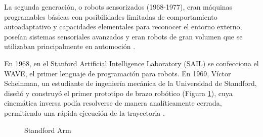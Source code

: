 
La segunda generación, o robots sensorizados (1968-1977), eran máquinas programables básicas con posibilidades limitadas de comportamiento autoadaptativo y capacidades elementales para reconocer el entorno externo, poseían sistemas sensoriales avanzados y eran robots de gran volumen que se utilizaban principalmente en automoción \cite{Zamalloa17}. 

En 1968, en el Stanford Artificial Intelligence Laboratory (SAIL) se confecciona el WAVE, el primer lenguaje de programación para robots. En 1969, %
Víctor Scheinman, un estudiante de ingeniería mecánica de la Universidad de Standford, diseñó y construyó el primer prototipo de brazo robótico (Figura \ref{fig:standford_arm}), cuya cinemática inversa podía resolverse de manera analíticamente cerrada, permitiendo una rápida ejecución de la trayectoria \cite{Gasparetto19}. 

  \begin{figure}[H]
    \begin{center}
      \subcapcentertrue
      \hspace{2mm}
    \end{center}
    \caption{Standford Arm}
    \label{fig:standford_arm}
  \end{figure}
 
